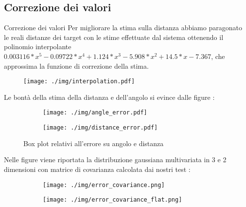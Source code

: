\documentclass[10pt]{beamer}
\begin{document}
	\subsection{Correzione dei valori}\label{subsec:Correzione-dei-valori}
	\begin{frame}[allowframebreaks]{Correzione dei valori}
		Per migliorare la stima sulla distanza abbiamo paragonato le reali
		distanze dei target con le stime effettuate dal sistema ottenendo il
		polinomio interpolante $0.003116*x^5 - 0.09722*x^4 + 1.124*x^3
		-5.908*x^2 + 14.5*x-7.367$, che approssima la funzione di correzione della stima. 
		
		\begin{figure}[H]
			\centering
			\texttt{[image: ./img/interpolation.pdf]}
			\label{fig:interpolation}
		\end{figure}

	\framebreak
	
	Le bontà della stima della distanza e dell'angolo si evince dalle figure :

	\begin{figure}[ht]
		\begin{subfigure}{.49\textwidth}
			\centering
			\texttt{[image: ./img/angle\_error.pdf]}  
			\label{fig:angle_plot}
		\end{subfigure}
		\begin{subfigure}{.49\textwidth}
			\centering
			\texttt{[image: ./img/distance\_error.pdf]}  
			\label{fig:distance_plot}
		\end{subfigure}
		\caption{Box plot relativi all'errore su angolo e distanza}
		\label{fig:boxes_plot}
	\end{figure}

	\framebreak

	Nelle figure viene riportata la distribuzione gaussiana multivariata
	in 3 e 2 dimensioni con matrice di covarianza calcolata dai nostri test :
	\begin{figure}[H]
		\begin{subfigure}{0.49\linewidth}
			\centering
			\texttt{[image: ./img/error\_covariance.png]}
			\label{fig:error_covariance}
		\end{subfigure}
		\begin{subfigure}{0.49\linewidth}
			\centering
			\texttt{[image: ./img/error\_covariance\_flat.png]}
			\label{fig:error_covariance_flat}
		\end{subfigure}
	\end{figure}

	\end{frame}
\end{document}
